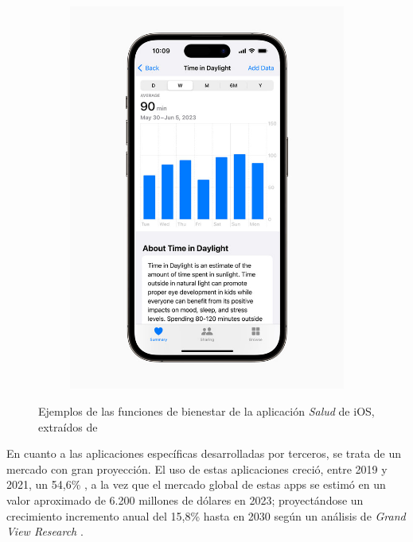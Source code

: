 \begin{figure}[h]
\begin{subfigure}[t]{0.49\textwidth}
                \includegraphics[width=1\linewidth]{figures/ios salud visual.jpg}
            \end{subfigure}
            \caption[Ejemplos de las funciones de bienestar de la aplicación \textit{Salud} de iOS]{Ejemplos de las funciones de bienestar de la aplicación \textit{Salud} de iOS, extraídos de \cite{noauthor_apple_2023}}
            \label{fig:estado_arte:ios_salud}
        \end{figure}

        En cuanto a las aplicaciones específicas desarrolladas por terceros, se trata de un mercado con gran proyección. El uso de estas aplicaciones creció, entre 2019 y 2021, un 54,6\% \cite{bejerano_lado_2023}, a la vez que el mercado global de estas apps se estimó en un valor aproximado de 6.200 millones de dólares en 2023; proyectándose un crecimiento incremento anual del 15,8\% hasta en 2030 según un análisis de \textit{Grand View Research} \cite{grand_view_research_mental_nodate}.
        
